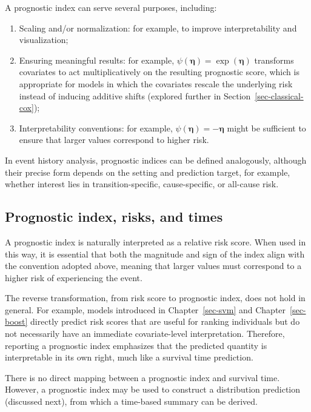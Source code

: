 \documentclass[
  letterpaper,
  krantz2]{style/krantz}
\providecommand{\tightlist}{%
  \setlength{\itemsep}{0pt}\setlength{\parskip}{0pt}}
\begin{document}
A prognostic index can serve several purposes, including:

\begin{enumerate}
\def\labelenumi{\arabic{enumi}.}
\tightlist
\item
  Scaling and/or normalization: for example, to improve interpretability
  and visualization;
\item
  Ensuring meaningful results: for example,
  \(\psi(\boldsymbol{\eta}) = \exp(\boldsymbol{\eta})\) transforms
  covariates to act multiplicatively on the resulting prognostic score,
  which is appropriate for models in which the covariates rescale the
  underlying risk instead of inducing additive shifts (explored further
  in Section~\ref{sec-classical-cox});
\item
  Interpretability conventions: for example,
  \(\psi(\boldsymbol{\eta}) = -\boldsymbol{\eta}\) might be sufficient
  to ensure that larger values correspond to higher risk.
\end{enumerate}

In event history analysis, prognostic indices can be defined
analogously, although their precise form depends on the setting and
prediction target, for example, whether interest lies in
transition-specific, cause-specific, or all-cause risk.

\subsection{Prognostic index, risks, and
times}\label{prognostic-index-risks-and-times}

A prognostic index is naturally interpreted as a relative risk
score. When used in this way, it is essential that
both the magnitude and sign of the index align with the convention
adopted above, meaning that larger values must correspond to a higher
risk of experiencing the event.

The reverse transformation, from risk score to prognostic index, does
not hold in general. For example, models introduced in
Chapter~\ref{sec-svm} and Chapter~\ref{sec-boost} directly predict risk
scores that are useful for ranking individuals but do not necessarily
have an immediate covariate-level
interpretation.
Therefore, reporting a prognostic index emphasizes that the predicted
quantity is interpretable in its own right, much like a survival time
prediction.

There is no direct mapping between a prognostic index and survival time.
However, a prognostic index may be used to construct a distribution
prediction (discussed next), from which a time-based summary can be
derived.
\end{document}
